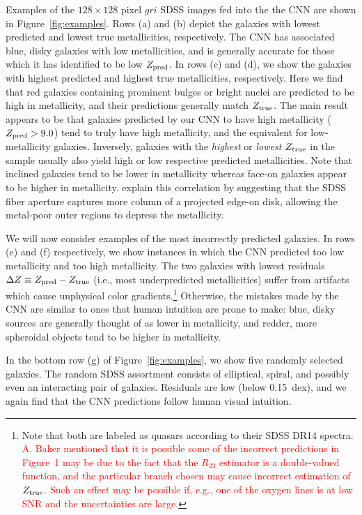 \documentclass[fleqn,usenatbib]{mnras}
\newcommand{\editorial}[1]{\textcolor{red}{#1}}
\begin{document}
Examples of the $128 \times 128$ pixel $gri$ SDSS images fed into the the CNN are shown in Figure~\ref{fig:examples}.
Rows (a) and (b) depict the galaxies with lowest predicted and lowest true metallicities, respectively.
The CNN has associated blue, disky galaxies with low metallicities, and is generally accurate for those which it has identified to be low $Z_{\rm pred}$.
In rows (c) and (d), we show the galaxies with highest predicted and highest true metallicities, respectively.
Here we find that red galaxies containing prominent bulges or bright nuclei are predicted to be high in metallicity, and their predictions generally match $Z_{\rm true}$.
The main result appears to be that galaxies predicted by our CNN to have high metallicity ($Z_{\rm pred} > 9.0$) tend to truly have high metallicity, and the equivalent for low-metallicity galaxies.
Inversely, galaxies with the \textit{highest} or \textit{lowest} $Z_{\rm true}$ in the sample usually also yield high or low respective predicted metallicities.
Note that inclined galaxies tend to be lower in metallicity whereas face-on galaxies appear to be higher in metallicity.
\cite{2004ApJ...613..898T} explain this correlation by suggesting that the SDSS fiber aperture captures more column of a projected edge-on disk, allowing the metal-poor outer regions to depress the metallicity.

We will now consider examples of the most incorrectly predicted galaxies.
In rows (e) and (f) respectively, we show instances in which the CNN predicted too low metallicity and too high metallicity.
The two galaxies with lowest residuals $\Delta Z \equiv Z_{\rm pred} - Z_{\rm true}$ (i.e., most underpredicted metallicities) suffer from artifacts which cause unphysical color gradients.\footnote{Note that both are labeled as quasars according to their SDSS DR14 spectra. \editorial{A. Baker mentioned that it is possible some of the incorrect predictions in Figure~1 may be due to the fact that the $R_{23}$ estimator is a double-valued function, and the particular branch chosen may cause incorrect estimation of $Z_{\rm true}$. Such an effect may be possible if, e.g., one of the oxygen lines is at low SNR and the uncertainties are large.}}
Otherwise, the mistakes made by the CNN are similar to ones that human intuition are prone to make: blue, disky sources are generally thought of as lower in metallicity, and redder, more spheroidal objects tend to be higher in metallicity.

In the bottom row (g) of Figure~\ref{fig:examples}, we show five randomly selected galaxies.
The random SDSS assortment consists of elliptical, spiral, and possibly even an interacting pair of galaxies.
Residuals are low (below 0.15~dex), and we again find that the CNN predictions follow human visual intuition.
\end{document}
